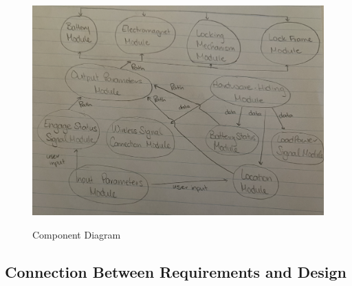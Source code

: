 \documentclass[12pt, titlepage]{article}
\begin{document}
 \begin{figure}[h!]
 \begin{center}
 {
  \includegraphics[width=0.8\linewidth]{component diagram.png}
 }
 \caption{\label{component diagram} Component Diagram}
 \end{center}
 \end{figure}

\subsection{Connection Between Requirements and Design} %
\end{document}

